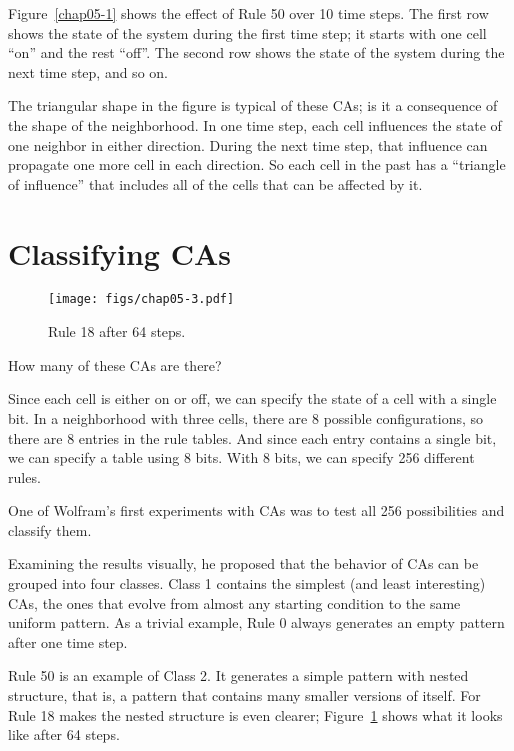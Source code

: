 \documentclass[12pt]{book}
\theoremstyle{exercise}
\begin{document}
Figure~\ref{chap05-1} shows the effect of Rule 50 over 10
time steps.  The first row shows the state of the system during the first
time step; it starts with one cell ``on'' and the rest ``off''.
The second row shows the state of the system during the
next time step, and so on.

The triangular shape in the figure is typical of these CAs; is it a
consequence of the shape of the neighborhood.  In one time step, each
cell influences the state of one neighbor in either direction.  During
the next time step, that influence can propagate one more cell in each
direction.  So each cell in the past has a ``triangle of influence''
that includes all of the cells that can be affected by it.



\section{Classifying CAs}

\begin{figure}
\centerline{\texttt{[image: figs/chap05-3.pdf]}}
\caption{Rule 18 after 64 steps.}
\label{chap05-3}
\end{figure}

How many of these CAs are there?

Since each cell is either on or off, we can specify the state
of a cell with a single bit.  In a neighborhood with three cells,
there are 8 possible configurations, so there are 8 entries
in the rule tables.  And since each entry contains a single bit,
we can specify a table using 8 bits.  With 8 bits, we can
specify 256 different rules.

One of Wolfram's first experiments with CAs was to test all 256
possibilities and classify them.

Examining the results visually, he proposed that the behavior of CAs
can be grouped into four classes.  Class 1 contains the simplest (and
least interesting) CAs, the ones that evolve from almost any starting
condition to the same uniform pattern.  As a trivial example, Rule 0
always generates an empty pattern after one time step.


Rule 50 is an example of Class 2.  It generates a simple pattern with
nested structure, that is, a pattern that contains many smaller versions
of itself.  For Rule 18 makes the nested structure is even clearer;
Figure~\ref{chap05-3} shows what it looks like after 64 steps.
\end{document}
